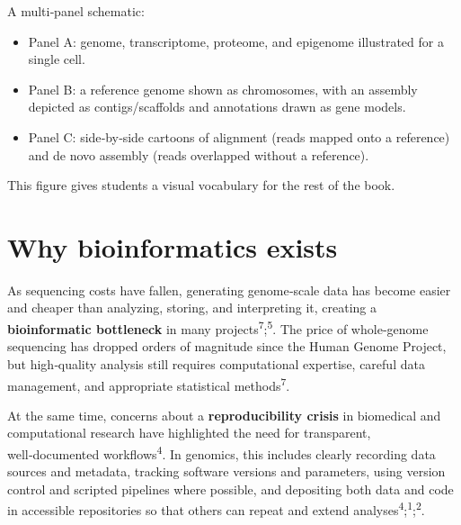 \documentclass[
  letterpaper,
  DIV=11,
  numbers=noendperiod]{scrreprt}
\providecommand{\tightlist}{%
  \setlength{\itemsep}{0pt}\setlength{\parskip}{0pt}}
\begin{document}
\begin{tcolorbox}[enhanced jigsaw, toptitle=1mm, arc=.35mm, toprule=.15mm, colframe=quarto-callout-note-color-frame, opacitybacktitle=0.6, breakable, left=2mm, titlerule=0mm, bottomtitle=1mm, rightrule=.15mm, title=\textcolor{quarto-callout-note-color}{\faInfo}\hspace{0.5em}{Figure 1.2 -- Core genome concepts}, opacityback=0, colbacktitle=quarto-callout-note-color!10!white, leftrule=.75mm, coltitle=black, bottomrule=.15mm, colback=white]

A multi‑panel schematic:

\begin{itemize}
\tightlist
\item
  Panel A: genome, transcriptome, proteome, and epigenome illustrated
  for a single cell.\\
\item
  Panel B: a reference genome shown as chromosomes, with an assembly
  depicted as contigs/scaffolds and annotations drawn as gene models.\\
\item
  Panel C: side‑by‑side cartoons of alignment (reads mapped onto a
  reference) and de novo assembly (reads overlapped without a
  reference).
\end{itemize}

This figure gives students a visual vocabulary for the rest of the book.

\end{tcolorbox}

\section{Why bioinformatics exists}\label{why-bioinformatics-exists}

As sequencing costs have fallen, generating genome‑scale data has become
easier and cheaper than analyzing, storing, and interpreting it,
creating a \textbf{bioinformatic bottleneck} in many
projects\textsuperscript{7};\textsuperscript{5}. The price of
whole‑genome sequencing has dropped orders of magnitude since the Human
Genome Project, but high‑quality analysis still requires computational
expertise, careful data management, and appropriate statistical
methods\textsuperscript{7}.

At the same time, concerns about a \textbf{reproducibility crisis} in
biomedical and computational research have highlighted the need for
transparent, well‑documented workflows\textsuperscript{4}. In genomics,
this includes clearly recording data sources and metadata, tracking
software versions and parameters, using version control and scripted
pipelines where possible, and depositing both data and code in
accessible repositories so that others can repeat and extend
analyses\textsuperscript{4};\textsuperscript{1};\textsuperscript{2}.
\end{document}
